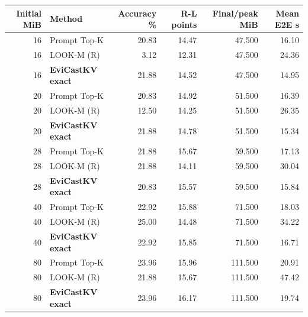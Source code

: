 \begin{tabular}{rlrrrr}
\toprule
Initial MiB & Method & Accuracy \% & R-L points & Final/peak MiB & Mean E2E s\\\midrule
16 & Prompt Top-K & 20.83 & 14.47 & 47.500 & 16.10\\
16 & LOOK-M (R) & 3.12 & 12.31 & 47.500 & 24.36\\
16 & \textbf{EviCastKV exact} & 21.88 & 14.52 & 47.500 & 14.95\\
20 & Prompt Top-K & 20.83 & 14.92 & 51.500 & 16.39\\
20 & LOOK-M (R) & 12.50 & 14.25 & 51.500 & 26.35\\
20 & \textbf{EviCastKV exact} & 21.88 & 14.78 & 51.500 & 15.34\\
28 & Prompt Top-K & 21.88 & 15.67 & 59.500 & 17.13\\
28 & LOOK-M (R) & 21.88 & 14.11 & 59.500 & 30.04\\
28 & \textbf{EviCastKV exact} & 20.83 & 15.57 & 59.500 & 15.84\\
40 & Prompt Top-K & 22.92 & 15.88 & 71.500 & 18.03\\
40 & LOOK-M (R) & 25.00 & 14.48 & 71.500 & 34.22\\
40 & \textbf{EviCastKV exact} & 22.92 & 15.85 & 71.500 & 16.71\\
80 & Prompt Top-K & 23.96 & 15.96 & 111.500 & 20.91\\
80 & LOOK-M (R) & 21.88 & 15.67 & 111.500 & 47.42\\
80 & \textbf{EviCastKV exact} & 23.96 & 16.17 & 111.500 & 19.74\\
\bottomrule
\end{tabular}
